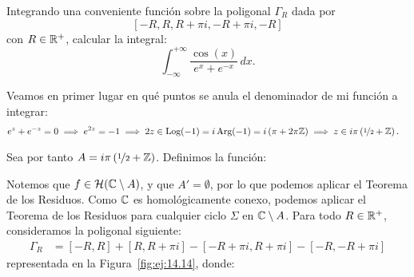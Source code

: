 \begin{ejercicio}\label{ej:14.14}
    Integrando una conveniente función sobre la poligonal $\Gamma_R$ dada por
    $$[-R, R, R + \pi i, -R + \pi i, -R]$$
    con $R \in \mathbb{R}^+$, calcular la integral:
    \begin{equation*}
        \int_{-\infty}^{+\infty} \frac{\cos(x)}{e^x + e^{-x}} \, dx.
    \end{equation*}

    Veamos en primer lugar en qué puntos se anula el denominador de mi función a integrar:
    \begin{align*}
        e^z + e^{-z} &= 0 \implies e^{2z} = -1 \implies 2z \in \operatorname{Log}(-1) = i\operatorname{Arg}(-1)=i\left(\pi + 2\pi \mathbb{Z}\right)
        \implies z \in i\pi \left(\nicefrac{1}{2} + \mathbb{Z}\right).
    \end{align*}

    Sea por tanto $A= i\pi \left(\nicefrac{1}{2} + \mathbb{Z}\right)$. Definimos la función:

    Notemos que $f\in \mathcal{H}(\mathbb{C}\setminus A)$, y que $A'=\emptyset$, por lo que podemos aplicar el Teorema de los Residuos. Como $\mathbb{C}$ es homológicamente conexo, podemos aplicar el Teorema de los Residuos para cualquier ciclo $\Sigma$ en $\mathbb{C}\setminus A$. Para todo $R\in \mathbb{R}^+$, consideramos la poligonal siguiente:
    \begin{align*}
        \Gamma_R &= [-R, R] + [R, R + \pi i] - [-R + \pi i, R + \pi i] - [-R, -R + \pi i]
    \end{align*}
    representada en la Figura~\ref{fig:ej:14.14}, donde:
    \begin{figure}
        \centering
\end{figure}
\end{ejercicio}
